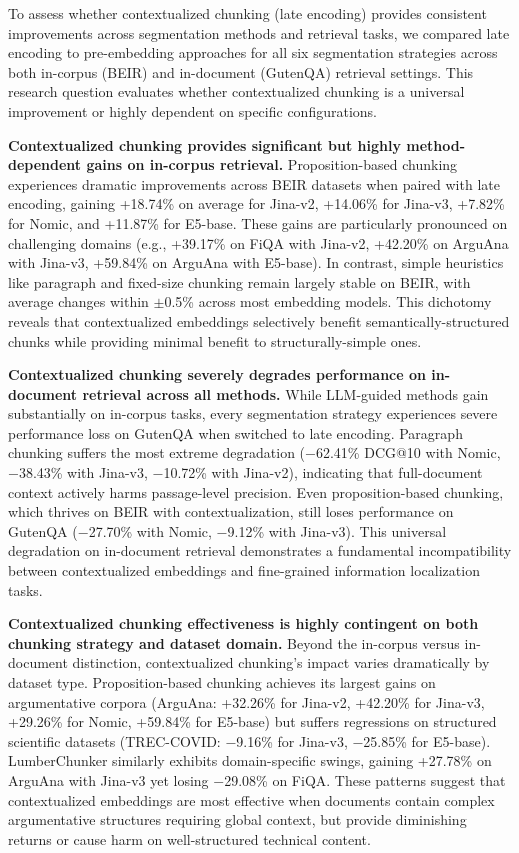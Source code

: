 To assess whether contextualized chunking (late encoding) provides consistent improvements across segmentation methods and retrieval tasks, we compared late encoding to pre-embedding approaches for all six segmentation strategies across both in-corpus (BEIR) and in-document (GutenQA) retrieval settings. This research question evaluates whether contextualized chunking is a universal improvement or highly dependent on specific configurations.

\textbf{Contextualized chunking provides significant but highly method-dependent gains on in-corpus retrieval.} Proposition-based chunking experiences dramatic improvements across BEIR datasets when paired with late encoding, gaining +18.74\% on average for Jina-v2, +14.06\% for Jina-v3, +7.82\% for Nomic, and +11.87\% for E5-base. These gains are particularly pronounced on challenging domains (e.g., +39.17\% on FiQA with Jina-v2, +42.20\% on ArguAna with Jina-v3, +59.84\% on ArguAna with E5-base). In contrast, simple heuristics like paragraph and fixed-size chunking remain largely stable on BEIR, with average changes within $\pm$0.5\% across most embedding models. This dichotomy reveals that contextualized embeddings selectively benefit semantically-structured chunks while providing minimal benefit to structurally-simple ones.

\textbf{Contextualized chunking severely degrades performance on in-document retrieval across all methods.} While LLM-guided methods gain substantially on in-corpus tasks, every segmentation strategy experiences severe performance loss on GutenQA when switched to late encoding. Paragraph chunking suffers the most extreme degradation ($-$62.41\% DCG@10 with Nomic, $-$38.43\% with Jina-v3, $-$10.72\% with Jina-v2), indicating that full-document context actively harms passage-level precision. Even proposition-based chunking, which thrives on BEIR with contextualization, still loses performance on GutenQA ($-$27.70\% with Nomic, $-$9.12\% with Jina-v3). This universal degradation on in-document retrieval demonstrates a fundamental incompatibility between contextualized embeddings and fine-grained information localization tasks.

\textbf{Contextualized chunking effectiveness is highly contingent on both chunking strategy and dataset domain.} Beyond the in-corpus versus in-document distinction, contextualized chunking's impact varies dramatically by dataset type. Proposition-based chunking achieves its largest gains on argumentative corpora (ArguAna: +32.26\% for Jina-v2, +42.20\% for Jina-v3, +29.26\% for Nomic, +59.84\% for E5-base) but suffers regressions on structured scientific datasets (TREC-COVID: $-$9.16\% for Jina-v3, $-$25.85\% for E5-base). LumberChunker similarly exhibits domain-specific swings, gaining +27.78\% on ArguAna with Jina-v3 yet losing $-$29.08\% on FiQA. These patterns suggest that contextualized embeddings are most effective when documents contain complex argumentative structures requiring global context, but provide diminishing returns or cause harm on well-structured technical content.

